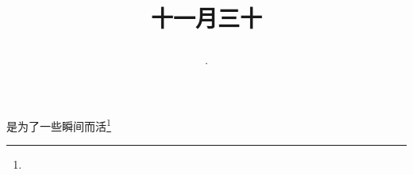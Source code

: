 \title{\date[d=30,m=12,y=2024][year:cn-y,年,month:cn,day:cn,日,·,weekday]·十一月三十 }
是为了一些瞬间而活\footnote{ }


